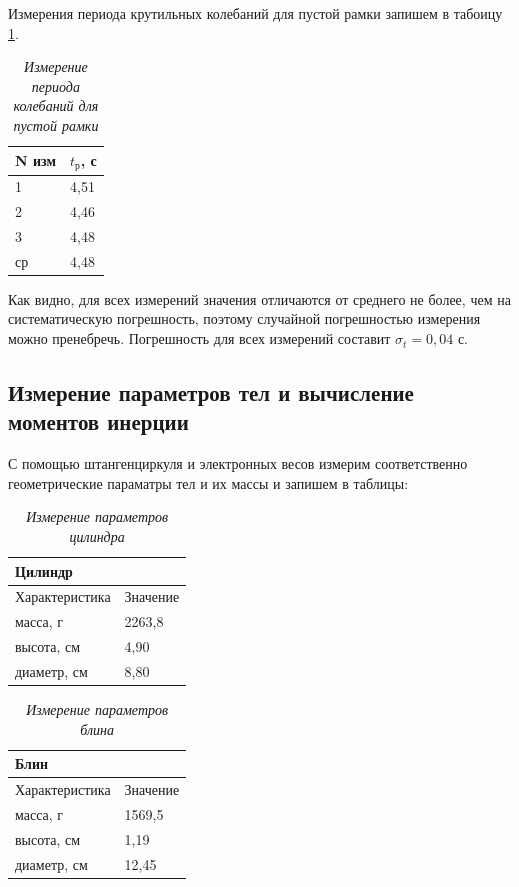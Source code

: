 \documentclass[a4paper, 12pt]{article}
\begin{document}
Измерения периода крутильных колебаний для пустой рамки запишем в табоицу \ref{ramka}.

\begin{table}[!ht]
    \centering
    \begin{tabular}{|l|l|}
    \hline
        N изм  & $t_\text{р}$, с \\ \hline
        1  & 4,51  \\ \hline
        2  & 4,46 \\ \hline
        3  & 4,48  \\ \hline
        ср & 4,48  \\ \hline
    \end{tabular}\caption{\textit{Измерение периода колебаний для пустой рамки}}\label{ramka}
\end{table}

Как видно, для всех измерений значения отличаются от среднего не более, чем на систематическую погрешность, поэтому случайной погрешностью измерения можно пренебречь. Погрешность для всех измерений составит $\sigma_t = 0,04 \text{ с}$.

\subsection{Измерение параметров тел и вычисление моментов инерции}

С помощью штангенциркуля и электронных весов измерим соответственно геометрические параматры тел и их массы и запишем в таблицы:

\begin{table}[!ht]
    \centering
    \begin{tabular}{|l|l|}
    \hline
        \textbf{Цилиндр} & ~ \\ \hline
        Характеристика & Значение \\ \hline
        масса, г & 2263,8 \\ \hline
        высота, см & 4,90 \\ \hline
        диаметр, см & 8,80 \\ \hline
    \end{tabular}\caption{\textit{Измерение параметров цилиндра}}
\end{table}

\begin{table}[!ht]
    \centering
    \begin{tabular}{|l|l|}
    \hline
        \textbf{Блин} & ~ \\ \hline
        Характеристика & Значение \\ \hline
        масса, г & 1569,5 \\ \hline
        высота, см & 1,19 \\ \hline
        диаметр, см & 12,45 \\ \hline
    \end{tabular}\caption{\textit{Измерение параметров блина}}
\end{table}
\end{document}
